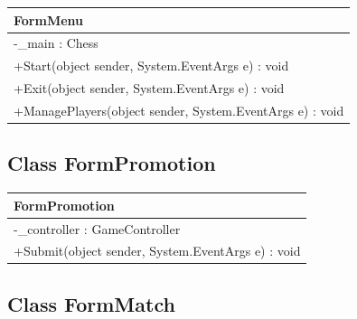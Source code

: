 \documentclass[12pt]{article}
\begin{document}
\begin{table}[H]
    \begin{tabular}{|l|}
    \hline
    \rowcolor[HTML]{C0C0C0} 
    \textbf{FormMenu}                                   \\ \hline
    \rowcolor[HTML]{EFEFEF} 
    -\_main : Chess                                          \\ \hline
    \rowcolor[HTML]{FFFFFF} 
    +Start(object sender, System.EventArgs e) : void         \\ \hline
    \rowcolor[HTML]{FFFFFF} 
    +Exit(object sender, System.EventArgs e) : void          \\ \hline
    \rowcolor[HTML]{FFFFFF} 
    +ManagePlayers(object sender, System.EventArgs e) : void \\ \hline
    \end{tabular}
\end{table}

\newpage


\subsection{Class FormPromotion}

\begin{table}[H]
    \begin{tabular}{|l|}
    \hline
    \rowcolor[HTML]{C0C0C0} 
    \textbf{FormPromotion}                            \\ \hline
    \rowcolor[HTML]{EFEFEF} 
    -\_controller : GameController                    \\ \hline
    \rowcolor[HTML]{FFFFFF} 
    +Submit(object sender, System.EventArgs e) : void \\ \hline
    \end{tabular}
\end{table}



\newpage


\subsection{Class FormMatch}
\end{document}
